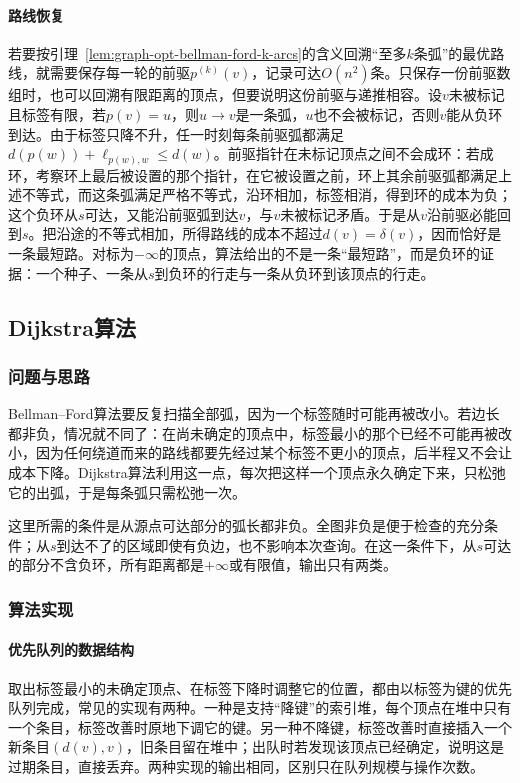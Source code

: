\paragraph{路线恢复}
若要按引理~\ref{lem:graph-opt-bellman-ford-k-arcs}的含义回溯“至多$k$条弧”的最优路线，就需要保存每一轮的前驱$p^{(k)}(v)$，记录可达$O(n^2)$条。只保存一份前驱数组时，也可以回溯有限距离的顶点，但要说明这份前驱与递推相容。设$v$未被标记且标签有限，若$p(v)=u$，则$u\to v$是一条弧，$u$也不会被标记，否则$v$能从负环到达。由于标签只降不升，任一时刻每条前驱弧都满足$d(p(w))+\ell_{p(w),w}\leq d(w)$。前驱指针在未标记顶点之间不会成环：若成环，考察环上最后被设置的那个指针，在它被设置之前，环上其余前驱弧都满足上述不等式，而这条弧满足严格不等式，沿环相加，标签相消，得到环的成本为负；这个负环从$s$可达，又能沿前驱弧到达$v$，与$v$未被标记矛盾。于是从$v$沿前驱必能回到$s$。把沿途的不等式相加，所得路线的成本不超过$d(v)=\delta(v)$，因而恰好是一条最短路。对标为$-\infty$的顶点，算法给出的不是一条“最短路”，而是负环的证据：一个种子、一条从$s$到负环的行走与一条从负环到该顶点的行走。

\subsection{Dijkstra算法}
\label{sec:graph-opt-dijkstra}

\subsubsection{问题与思路}

Bellman--Ford算法要反复扫描全部弧，因为一个标签随时可能再被改小。若边长都非负，情况就不同了：在尚未确定的顶点中，标签最小的那个已经不可能再被改小，因为任何绕道而来的路线都要先经过某个标签不更小的顶点，后半程又不会让成本下降。Dijkstra算法利用这一点，每次把这样一个顶点永久确定下来，只松弛它的出弧，于是每条弧只需松弛一次。

这里所需的条件是从源点可达部分的弧长都非负。全图非负是便于检查的充分条件；从$s$到达不了的区域即使有负边，也不影响本次查询。在这一条件下，从$s$可达的部分不含负环，所有距离都是$+\infty$或有限值，输出只有两类。

\subsubsection{算法实现}

\paragraph{优先队列的数据结构}
取出标签最小的未确定顶点、在标签下降时调整它的位置，都由以标签为键的优先队列完成，常见的实现有两种。一种是支持“降键”的索引堆，每个顶点在堆中只有一个条目，标签改善时原地下调它的键。另一种不降键，标签改善时直接插入一个新条目$(d(v),v)$，旧条目留在堆中；出队时若发现该顶点已经确定，说明这是过期条目，直接丢弃。两种实现的输出相同，区别只在队列规模与操作次数。

